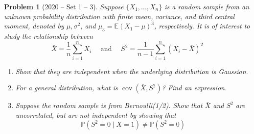 \documentclass[12pt]{amsart}
\newtheorem{problem}{Problem}
\begin{document}
\begin{problem}[2020 -- Set 1 -- 3]
Suppose $\{X_1, \ldots, X_n\}$ is a random sample from an unknown probability distribution with finite mean, variance, and third central moment, denoted by $\mu, \sigma^2$, and $\mu_3=\mathbb{E}(X_1-\mu)^3$, respectively. It is of interest to study the relationship between
$$
\bar{X}=\frac{1}{n} \sum_{i=1}^n X_i \quad \text { and } \quad S^2=\frac{1}{n-1} \sum_{i=1}^n(X_i-\bar{X})^2
$$
\begin{enumerate}[label=(\alph*)]
\item Show that they are independent when the underlying distribution is Gaussian.
\item For a general distribution, what is $\operatorname{cov}(\bar{X}, S^2)$? Find an expression.
\item Suppose the random sample is from Bernoulli(1/2). Show that $\bar{X}$ and $S^2$ are uncorrelated, but are not independent by showing that
$$
\mathbb{P}(S^2=0 \mid \bar{X}=1) \neq \mathbb{P}(S^2=0)
$$
\end{enumerate}
\end{problem}
\end{document}
